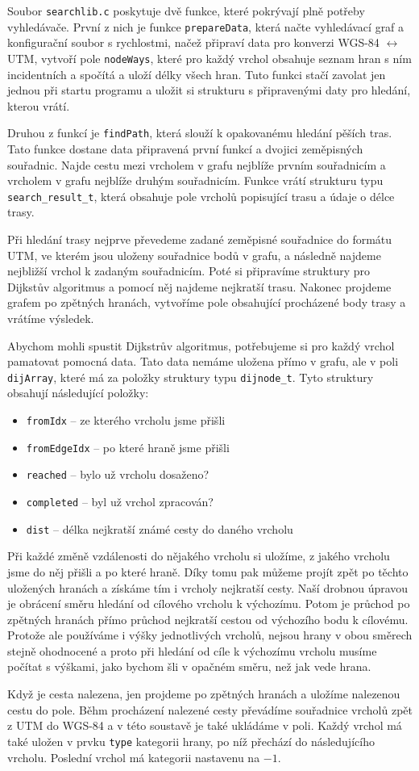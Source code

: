Soubor \verb|searchlib.c| poskytuje dvě funkce, které pokrývají plně potřeby
vyhledávače. První z nich je funkce \verb|prepareData|, která načte vyhledávací
graf a konfigurační soubor s rychlostmi, načež připraví data pro konverzi WGS-84
$\leftrightarrow$ UTM, vytvoří pole \verb|nodeWays|, které pro každý vrchol
obsahuje seznam hran s ním incidentních a spočítá a uloží délky všech hran. Tuto
funkci stačí zavolat jen jednou při startu programu a uložit si strukturu s
připravenými daty pro hledání, kterou vrátí.

Druhou z funkcí je \verb|findPath|, která slouží k opakovanému hledání pěších
tras. Tato funkce dostane data připravená první funkcí a dvojici zeměpisných
souřadnic. Najde cestu mezi vrcholem v grafu nejblíže prvním souřadnicím a
vrcholem v grafu nejblíže druhým souřadnicím. Funkce vrátí strukturu typu
\verb|search_result_t|, která obsahuje pole vrcholů popisující trasu a údaje o délce
trasy.

Při hledání trasy nejprve převedeme zadané zeměpisné souřadnice do formátu UTM,
ve kterém jsou uloženy souřadnice bodů v grafu, a následně najdeme nejbližší
vrchol k zadaným souřadnicím. Poté si připravíme struktury pro Dijkstův
algoritmus a pomocí něj najdeme nejkratší trasu. Nakonec projdeme grafem po
zpětných hranách, vytvoříme pole obsahující procházené body trasy a vrátíme
výsledek.

Abychom mohli spustit Dijkstrův algoritmus, potřebujeme si pro každý vrchol
pamatovat pomocná data. Tato data nemáme uložena přímo v grafu, ale v poli
\verb|dijArray|, které má za položky struktury typu \verb|dijnode_t|. Tyto
struktury obsahují následující položky:
\begin{itemize}
	\item \verb|fromIdx| -- ze kterého vrcholu jsme přišli 
	\item \verb|fromEdgeIdx| -- po které hraně jsme přišli
	\item \verb|reached| -- bylo už vrcholu dosaženo? 
	\item \verb|completed| -- byl už vrchol zpracován?
	\item \verb|dist| -- délka nejkratší známé cesty do daného vrcholu
\end{itemize}

Při každé
změně vzdálenosti do nějakého vrcholu si uložíme, z jakého vrcholu jsme do něj
přišli a po které hraně. Díky tomu pak můžeme projít zpět po těchto uložených
hranách a získáme tím i vrcholy nejkratší cesty. Naší drobnou úpravou je obrácení směru
hledání od cílového vrcholu k výchozímu. Potom je průchod po zpětných hranách
přímo průchod nejkratší cestou od výchozího bodu k cílovému. Protože ale
používáme i výšky jednotlivých vrcholů, nejsou hrany v obou směrech stejně
ohodnocené a proto při hledání od cíle k výchozímu vrcholu musíme počítat s
výškami, jako bychom šli v opačném směru, než jak vede hrana.

Když je cesta nalezena, jen projdeme po zpětných hranách a uložíme nalezenou
cestu do pole. Běhm procházení nalezené cesty převádíme souřadnice vrcholů zpět
z UTM do WGS-84 a v této soustavě je také ukládáme v poli. Každý vrchol má také
uložen v prvku \verb|type| kategorii hrany, po níž přechází do následujícího
vrcholu. Poslední vrchol má kategorii nastavenu na $-1$.
